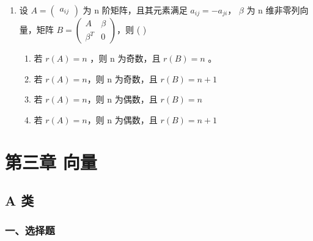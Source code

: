 \documentclass[12pt, a4paper]{ctexart}
\begin{document}
\begin{enumerate}
    \item 设 $ A = \begin{pmatrix} a_{ij} \end{pmatrix} $ 为 n 阶矩阵，且其元素满足 $ a_{ij} = -a_{ji} $， $ \beta $ 为 n 维非零列向量，矩阵 $ B = \begin{pmatrix} A & \beta \\ \beta^{T} & 0 \end{pmatrix} $，则 ( \underline{\hspace{1cm}} )
    \begin{enumerate}[label=(\Alph*)]
        \item 若 $ r(A)=n $ ，则 n 为奇数，且 $ r(B)=n $ 。
        \item 若 $ r(A) = n $，则 n 为奇数，且 $ r(B) = n + 1 $
        \item 若 $ r(A) = n $，则 n 为偶数，且 $ r(B) = n $
        \item 若 $ r(A) = n $，则 n 为偶数，且 $ r(B) = n + 1 $
    \end{enumerate}
\end{enumerate}

\section{第三章 向量}

\subsection{A 类}

\subsubsection*{一、选择题}
\end{document}
